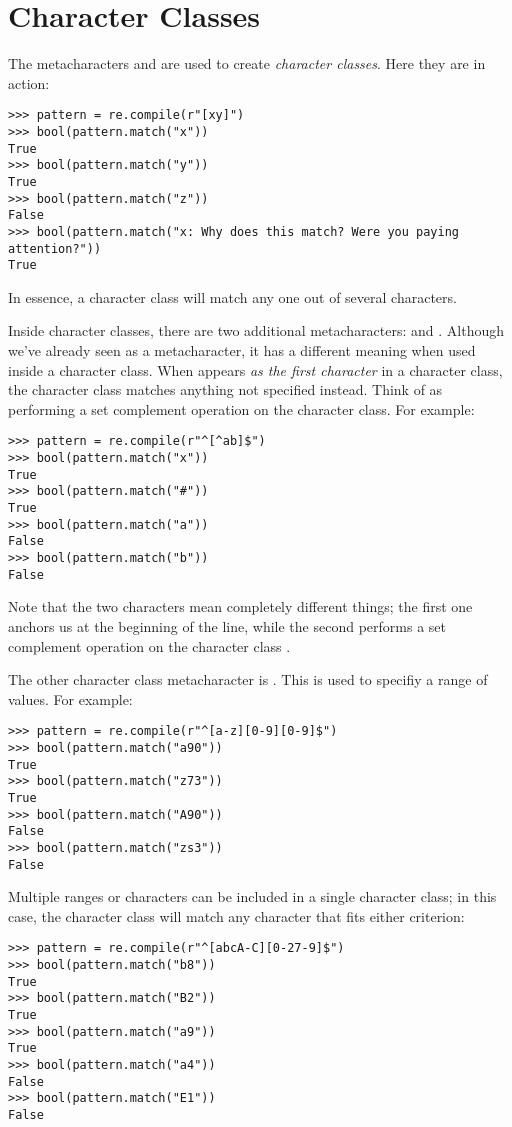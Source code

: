 \section*{Character Classes}
The metacharacters \li{'['} and \li{']'} are used to create \emph{character classes}.
Here they are in action:
\begin{lstlisting}
>>> pattern = re.compile(r"[xy]")
>>> bool(pattern.match("x"))
True
>>> bool(pattern.match("y"))
True
>>> bool(pattern.match("z"))
False
>>> bool(pattern.match("x: Why does this match? Were you paying attention?"))
True
\end{lstlisting}

In essence, a character class will match any one out of several characters.

Inside character classes, there are two additional metacharacters:  and .
Although we've already seen  as a metacharacter, it has a different meaning when used inside a character class.
When  appears \emph{as the first character} in a character class, the character class matches anything not specified instead.
Think of  as performing a set complement operation on the character class.
For example:
\begin{lstlisting}
>>> pattern = re.compile(r"^[^ab]$")
>>> bool(pattern.match("x"))
True
>>> bool(pattern.match("#"))
True
>>> bool(pattern.match("a"))
False
>>> bool(pattern.match("b"))
False
\end{lstlisting}

Note that the two  characters mean completely different things; the first one anchors us at the beginning of the line, while the second  performs a set complement operation on the character class .

The other character class metacharacter is . This is used to specifiy a range of values.
For example:
\begin{lstlisting}
>>> pattern = re.compile(r"^[a-z][0-9][0-9]$")
>>> bool(pattern.match("a90"))
True
>>> bool(pattern.match("z73"))
True
>>> bool(pattern.match("A90"))
False
>>> bool(pattern.match("zs3"))
False
\end{lstlisting}

Multiple ranges or characters can be included in a single character class; in this case, the character class will match any character that fits either criterion:
\begin{lstlisting}
>>> pattern = re.compile(r"^[abcA-C][0-27-9]$")
>>> bool(pattern.match("b8"))
True
>>> bool(pattern.match("B2"))
True
>>> bool(pattern.match("a9"))
True
>>> bool(pattern.match("a4"))
False
>>> bool(pattern.match("E1"))
False
\end{lstlisting}

